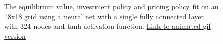 \documentclass[12pt]{article}
\begin{document}
\begin{figure}[H]
  \centering
  \caption{The equilibrium value, investment policy and pricing policy fit on an 18x18 grid using a neural net with a single fully connected layer with 324 nodes and tanh activation function. \href{https://github.com/wmjones/VFA-for-dynamic-games/blob/master/gifs/gif_ann_18.gif}{Link to animated gif version}}
\end{figure}
\end{document}
